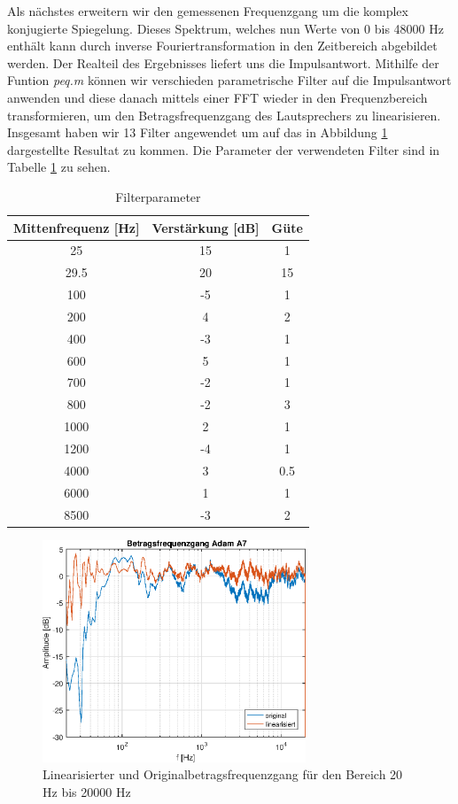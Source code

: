 Als nächstes erweitern wir den gemessenen Frequenzgang um die komplex konjugierte Spiegelung. 
Dieses Spektrum, welches nun Werte von 0 bis 48000 Hz enthält kann durch inverse Fouriertransformation in den Zeitbereich abgebildet werden.
Der Realteil des Ergebnisses liefert uns die Impulsantwort.
Mithilfe der Funtion \textit{peq.m} können wir verschieden parametrische Filter auf die Impulsantwort anwenden und diese danach mittels einer FFT wieder in den Frequenzbereich transformieren, um den Betragsfrequenzgang des Lautsprechers zu linearisieren.
Insgesamt haben wir 13 Filter angewendet um auf das in Abbildung \ref{fig:frequenzgangA7_lin} dargestellte Resultat zu kommen.
Die Parameter der verwendeten Filter sind in Tabelle \ref{tab:filterparameter} zu sehen.

\begin{table}[H]
    \centering
    \caption{Filterparameter}
    \label{tab:filterparameter}
    \begin{tabular}{| c |c |c |}
    	\hline
        Mittenfrequenz [Hz] & Verstärkung [dB] & Güte\\
        \hline
        25 & 15 & 1 \\
		29.5 & 20 & 15 \\
		100 & -5 & 1\\
		200 & 4 & 2\\
		400 & -3 & 1 \\
		600 & 5 & 1\\
		700 &-2 & 1 \\
		800 & -2 & 3\\
		1000 & 2 & 1\\
		1200 & -4 & 1\\
		4000 & 3 & 0.5\\
		6000 & 1 & 1\\
		8500 & -3 & 2\\
        \hline
    \end{tabular}
\end{table}

\begin{figure}[H]
        \centering
        \includegraphics[width=0.7\textwidth]{Figures/frequenzgangA7_lin.eps}
        \caption{Linearisierter und Originalbetragsfrequenzgang für den Bereich 20 Hz bis 20000 Hz}
        \label{fig:frequenzgangA7_lin}
\end{figure}




